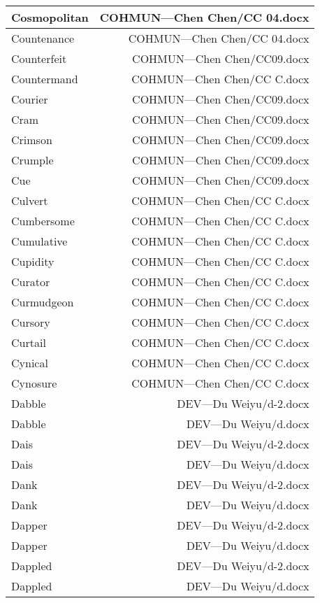 \documentclass{article}
\begin{document}
\begin{center}
\begin{longtable}{|l|r|}
\hline
Cosmopolitan  &  COHMUN---Chen Chen/CC 04.docx\\  
\hline
Countenance  &  COHMUN---Chen Chen/CC 04.docx\\  
\hline
Counterfeit  &  COHMUN---Chen Chen/CC09.docx\\  
\hline
Countermand  &  COHMUN---Chen Chen/CC C.docx\\  
\hline
Courier  &  COHMUN---Chen Chen/CC09.docx\\  
\hline
Cram  &  COHMUN---Chen Chen/CC09.docx\\  
\hline
Crimson  &  COHMUN---Chen Chen/CC09.docx\\  
\hline
Crumple  &  COHMUN---Chen Chen/CC09.docx\\  
\hline
Cue  &  COHMUN---Chen Chen/CC09.docx\\  
\hline
Culvert  &  COHMUN---Chen Chen/CC C.docx\\  
\hline
Cumbersome  &  COHMUN---Chen Chen/CC C.docx\\  
\hline
Cumulative  &  COHMUN---Chen Chen/CC C.docx\\  
\hline
Cupidity  &  COHMUN---Chen Chen/CC C.docx\\  
\hline
Curator  &  COHMUN---Chen Chen/CC C.docx\\  
\hline
Curmudgeon  &  COHMUN---Chen Chen/CC C.docx\\  
\hline
Cursory  &  COHMUN---Chen Chen/CC C.docx\\  
\hline
Curtail  &  COHMUN---Chen Chen/CC C.docx\\  
\hline
Cynical  &  COHMUN---Chen Chen/CC C.docx\\  
\hline
Cynosure  &  COHMUN---Chen Chen/CC C.docx\\  
\hline
Dabble  &  DEV---Du Weiyu/d-2.docx\\  
\hline
Dabble  &  DEV---Du Weiyu/d.docx\\  
\hline
Dais  &  DEV---Du Weiyu/d-2.docx\\  
\hline
Dais  &  DEV---Du Weiyu/d.docx\\  
\hline
Dank  &  DEV---Du Weiyu/d-2.docx\\  
\hline
Dank  &  DEV---Du Weiyu/d.docx\\  
\hline
Dapper  &  DEV---Du Weiyu/d-2.docx\\  
\hline
Dapper  &  DEV---Du Weiyu/d.docx\\  
\hline
Dappled  &  DEV---Du Weiyu/d-2.docx\\  
\hline
Dappled  &  DEV---Du Weiyu/d.docx\\  

\end{longtable}
\end{center}
\end{document}
